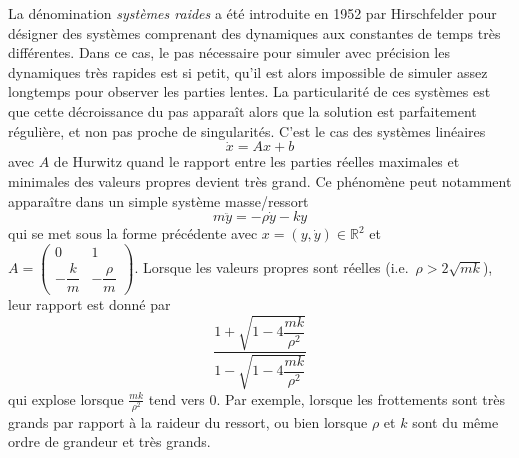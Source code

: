 La dénomination \emph{systèmes raides} a été introduite en 1952 par
Hirschfelder pour désigner des systèmes comprenant des dynamiques aux
constantes de temps très différentes. Dans ce cas, le pas nécessaire
pour simuler avec précision les dynamiques très rapides est si petit,
qu'il est alors impossible de simuler assez longtemps pour observer les
parties lentes. La particularité de ces systèmes est que cette
décroissance du pas apparaît alors que la solution est parfaitement
régulière, et non pas proche de singularités. C'est le cas des systèmes
linéaires \[
\dot{x} = A x + b
\] avec \(A\) de Hurwitz quand le rapport entre les parties réelles
maximales et minimales des valeurs propres devient très grand. Ce
phénomène peut notamment apparaître dans un simple système masse/ressort
\[
m\ddot{y} = -\rho \dot{y} - k y
\] qui se met sous la forme précédente avec
\(x=(y,\dot{y})\in \mathbb{R}^2\) et
\(A=\left(\begin{smallmatrix} 0&1\\-\dfrac{k}{m} & -\dfrac{\rho}{m} \end{smallmatrix}\right)\).
Lorsque les valeurs propres sont réelles (i.e.~\(\rho>2\sqrt{mk}\)),
leur rapport est donné par \[
\frac{1+\sqrt{1-4\dfrac{mk}{\rho^2}}}{1-\sqrt{1-4\dfrac{mk}{\rho^2}}}
\] qui explose lorsque \(\frac{mk}{\rho^2}\) tend vers 0. Par exemple,
lorsque les frottements sont très grands par rapport à la raideur du
ressort, ou bien lorsque \(\rho\) et \(k\) sont du même ordre de
grandeur et très grands.

